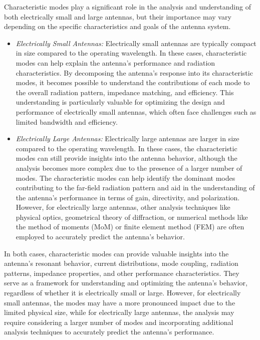 \documentclass[11pt,a4paper]{article}
\begin{document}
Characteristic modes play a significant role in the analysis and understanding of both electrically small and large antennas, but their importance may vary depending on the specific characteristics and goals of the antenna system.
\begin{itemize}
    \item \emph{Electrically Small Antennas:} Electrically small antennas are typically compact in size compared to the operating wavelength. In these cases, characteristic modes can help explain the antenna's performance and radiation characteristics. By decomposing the antenna's response into its characteristic modes, it becomes possible to understand the contributions of each mode to the overall radiation pattern, impedance matching, and efficiency. This understanding is particularly valuable for optimizing the design and performance of electrically small antennas, which often face challenges such as limited bandwidth and efficiency.
    \item \emph{Electrically Large Antennas:} Electrically large antennas are larger in size compared to the operating wavelength. In these cases, the characteristic modes can still provide insights into the antenna behavior, although the analysis becomes more complex due to the presence of a larger number of modes. The characteristic modes can help identify the dominant modes contributing to the far-field radiation pattern and aid in the understanding of the antenna's performance in terms of gain, directivity, and polarization. However, for electrically large antennas, other analysis techniques like physical optics, geometrical theory of diffraction, or numerical methods like the method of moments (MoM) or finite element method (FEM) are often employed to accurately predict the antenna's behavior.
\end{itemize}
In both cases, characteristic modes can provide valuable insights into the antenna's resonant behavior, current distributions, mode coupling, radiation patterns, impedance properties, and other performance characteristics. They serve as a framework for understanding and optimizing the antenna's behavior, regardless of whether it is electrically small or large. However, for electrically small antennas, the modes may have a more pronounced impact due to the limited physical size, while for electrically large antennas, the analysis may require considering a larger number of modes and incorporating additional analysis techniques to accurately predict the antenna's performance.
\end{document}
